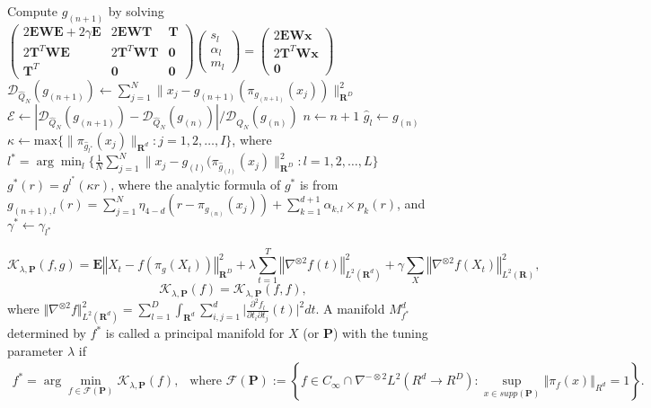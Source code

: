 \documentclass[11pt,reqno]{article}
\begin{document}
\begin{algorithm}
{{        Compute $g_{(n + 1)}$ by solving $\left(\begin{array}{ccc} 
        2\mathbf{E}\mathbf{W}\mathbf{E} + 2\gamma\mathbf{E} & 2\mathbf{E}\mathbf{W}\mathbf{T} & \mathbf{T} \\
        2\mathbf{T}^T\mathbf{W}\mathbf{E} & 2\mathbf{T}^T\mathbf{W}\mathbf{T} & \mathbf{0} \\
        \mathbf{T}^T & \mathbf{0} & \mathbf{0} \end{array}\right)\left(\begin{array}{c} 
        s_l \\
        \alpha_l \\
        m_l 
        \end{array}\right) = \left(\begin{array}{c}
        2\mathbf{E}\mathbf{W}\mathbf{x} \\
        2\mathbf{T}^T\mathbf{W}\mathbf{x} \\
        \mathbf{0} 
        \end{array}\right)$\;
        $\mathcal{D}_{\hat{Q}_N}(g_{(n + 1)}) \gets \sum_{j=1}^N\|x_j - g_{(n + 1)}(\pi_{g_{(n + 1)}}(x_j))\|_{\mathbf{R}^D}^2$\;
        $\mathcal{E} \gets |\mathcal{D}_{\hat{Q}_N}(g_{(n + 1)}) - \mathcal{D}_{\hat{Q}_N}(g_{(n)})|/\mathcal{D}_{\hat{Q}_N}(g_{(n)})$\;
        $n \gets n + 1$\;
    }
    $\hat{g}_l \gets g_{(n)}$\;
}
$\kappa \gets \text{max}\{\|\pi_{\hat{g}_{l^*}}(x_j)\|_{\mathbf{R}^d}: j = 1, 2, \dots, I\}$, where $l^* = \arg \min_l\{\frac{1}{N}\sum_{j=1}^N\|x_j - g_{(l)}(\pi_{\hat{g}_{(l)}}(x_j)\|_{\mathbf{R}^D}^2: l = 1, 2, \dots, L\}$\;
$g^*(r) = g^{l^*}(\kappa r)$, where the analytic formula of $g^*$ is from $g_{(n + 1), l}(r) = \sum_{j=1}^N \eta_{4-d}(r - \pi_{g_{(n)}}(x_j)) + \sum_{k=1}^{d + 1} \alpha_{k, l} \times p_k(r)$, and $\gamma^* \gets \gamma_{l^*}$
\end{algorithm}

	\begin{equation}\label{PMSEF}
	\mathcal{K}_{\lambda,\mathbf{P}}(f,g)=\mathbf{E}\left\Vert X_t - f\left(\pi_g(X_t)\right)\right\Vert^2_{\mathbf{R}^D} + \lambda \sum_{t = 1}^T \left\Vert\nabla^{\otimes 2} f(t)\right\Vert_{L^2(\mathbf{R}^d)}^2 + \gamma \sum_{X} \left\Vert\nabla^{\otimes 2} f(X_t)\right\Vert_{L^2(\mathbf{R})}^2, 
	\end{equation}
	\begin{equation}\nonumber
	\mathcal{K}_{\lambda,\mathbf{P}}(f)=\mathcal{K}_{\lambda,\mathbf{P}}(f,f),
	\end{equation}
	where $\Vert\nabla^{\otimes 2}f \Vert_{L^2(\mathbf{R}^d)}^2 = \sum_{l=1}^D\int_{\mathbf{R}^d} \sum_{i,j=1}^d\vert\frac{\partial^2 f_l}{\partial t_i \partial t_j}(t)\vert^2dt$. A manifold $M_{f^*}^d$ determined by $f^*$ is called a principal manifold for $X$ (or $\mathbf{P}$) with the tuning parameter $\lambda$ if 
	\begin{align}\label{def: PM}
	f^*=\arg\min_{f\in\mathscr{F}(\mathbf{P})}\mathcal{K}_{\lambda,\mathbf{P}}(f),\ \ \mbox{ where }\mathscr{F}(\mathbf{P}):=\left\{f\in C_\infty\cap \nabla^{-\otimes 2}L^2( R^d \rightarrow R^D):\sup_{x\in supp(\mathbf{P})}\left\Vert\pi_f(x)\right\Vert_{R^d} = 1 \right\}.
	\end{align}
\end{document}
